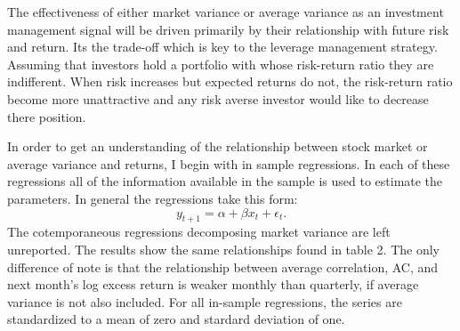 The effectiveness of either market variance or average variance as an investment management signal will be driven primarily by their relationship with future risk and return. Its the trade-off which is key to the leverage management strategy. Assuming that investors hold a portfolio with whose risk-return ratio they are indifferent. When risk increases but expected returns do not, the risk-return ratio become more unattractive and any risk averse investor would like to decrease there position. 

In order to get an understanding of the relationship between stock market or average variance and returns, I begin with in sample regressions. In each of these regressions all of the information available in the sample is used to estimate the parameters. In general the regressions take this form:
\begin{equation}
	y_{t+1} = \alpha + \beta x_{t} + \epsilon_{t}.
\end{equation}
The cotemporaneous regressions decomposing market variance are left unreported. The results show the same relationships found in \citet{pollet_average_2010} table 2. The only difference of note is that the relationship between average correlation, AC, and next month's log excess return is weaker monthly than quarterly, if average variance is not also included. For all in-sample regressions, the series are standardized to a mean of zero and stardard deviation of one.

